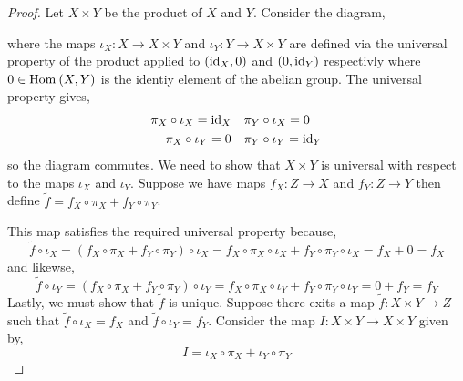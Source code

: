\documentclass[12pt]{article}
\begin{document}
\begin{proof}
Let $X \times Y$ be the product of $X$ and $Y$. Consider the diagram,
\begin{center}
\end{center}
where the maps $\iota_X : X \to X \times Y$ and $\iota_Y : Y \to X \times Y$ are defined via the universal property of the product applied to $(\mathrm{id}_X, 0)$ and $(0, \mathrm{id}_Y)$ respectivly where $0 \in \mathrm{Hom}_{} \left( X, Y \right)$ is the identiy element of the abelian group. The universal property gives,
\begin{align*}
\pi_X \circ \iota_X = \mathrm{id}_X &\quad \pi_Y \circ \iota_X = 0
\\
\pi_X \circ \iota_Y = 0 &\quad \pi_Y \circ \iota_Y = \mathrm{id}_Y 
\end{align*}
so the diagram commutes. We need to show that $X \times Y$ is universal with respect to the maps $\iota_X$ and $\iota_Y$. Suppose we have maps $f_X : Z \to X$ and $f_Y : Z \to Y$ then define $\tilde{f} = f_X \circ \pi_X + f_Y \circ \pi_Y$.
\begin{center}
\end{center}
This map satisfies the required universal property because,
\[ \tilde{f} \circ \iota_X = (f_X \circ \pi_X + f_Y \circ \pi_Y) \circ \iota_X = f_X \circ \pi_X \circ \iota_X + f_Y \circ \pi_Y \circ \iota_X = f_X + 0 = f_X \]
and likewse,
\[ \tilde{f} \circ \iota_Y = (f_X \circ \pi_X + f_Y \circ \pi_Y) \circ \iota_Y = f_X \circ \pi_X \circ \iota_Y + f_Y \circ \pi_Y \circ \iota_Y = 0 + f_Y = f_Y \]
Lastly, we must show that $\tilde{f}$ is unique. Suppose there exits a map $\tilde{f} : X \times Y \to Z$ such that $\tilde{f} \circ \iota_X = f_X$ and $\tilde{f} \circ \iota_Y = f_Y$. Consider the map $I : X \times Y \to X \times Y$ given by,
\[ I = \iota_X \circ \pi_X + \iota_Y \circ \pi_Y \]

\end{proof}
\end{document}
